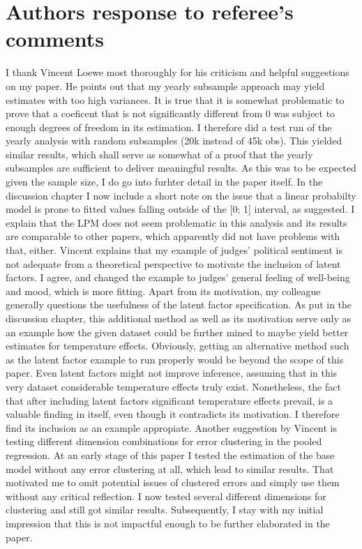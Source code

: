 \documentclass[11pt]{article}
\begin{document}
	\section{Authors response to referee's comments}
			I thank Vincent Loewe most thoroughly for his criticism and helpful suggestions on my paper. He points out that my yearly subsample approach may yield estimates with too high variances. It is true that it is somewhat problematic to prove that a coeficent that is not significantly different from 0 was subject to enough degrees of freedom in its estimation. I therefore did a test run of the yearly analysis with random subsamples (20k instead of 45k obs). This yielded similar results, which shall serve as somewhat of a proof that the yearly subsamples are sufficient to deliver meaningful results. As this was to be expected given the sample size, I do go into furhter detail in the paper itself.
			\newline In the discussion chapter I now include a short note on the issue that a linear probabilty model is prone to fitted values falling outside of the [0; 1] interval, as suggested. I explain that the LPM does not seem problematic in this analysis and its results are comparable to other papers, which apparently did not have problems with that, either.
			\newline Vincent explains that my example of judges' political sentiment is not adequate from a theoretical perspective to motivate the inclusion of latent factors. I agree, and changed the example to judges' general feeling of well-being and mood, which is more fitting. 
			Apart from its motivation, my colleague generally questions the usefulness of the latent factor specification. As put in the discussion chapter, this additional method as well as its motivation serve only as an example how the given dataset could be further mined to maybe yield better estimates for temperature effects. Obviously, getting an alternative method such as the latent factor example to run properly would be beyond the scope of this paper. Even latent factors might not improve inference, assuming that in this very dataset considerable temperature effects truly exist. Nonetheless, the fact that after including latent factors significant temperature effects prevail, is a valuable finding in itself, even though it contradicts its motivation. I therefore find its inclusion as an example appropiate.
			\newline Another suggestion by Vincent is testing different dimension combinations for error clustering in the pooled regression. At an early stage of this paper I tested the estimation of the base model without any error clustering at all, which lead to similar results. That motivated me to omit potential issues of clustered errors and simply use them without any critical reflection. I now tested several different dimensions for clustering and still got similar results. Subsequently, I stay with my initial impression that this is not impactful enough to be further elaborated in the paper.
			
\end{document}
